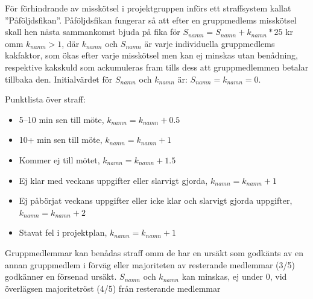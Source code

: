 \documentclass[a4paper]{article}
\begin{document}
För förhindrande av misskötsel i projektgruppen införs ett straffsystem kallat ”Påföljdsfikan”. Påföljdsfikan fungerar så att efter en gruppmedlems misskötsel skall hen nästa sammankomst bjuda på fika för $S_{namn} = S_{namn} + k_{namn}*25$ kr omm $k_{namn}>1$, där $k_{namn}$ och $S_{namn}$ är varje individuella gruppmedlems kakfaktor, som ökas efter varje misskötsel men kan ej minskas utan benådning, respektive kakskuld som ackumuleras fram tills dess att gruppmedlemmen betalar tillbaka den. Initialvärdet för $S_{namn}$ och $k_{namn}$ är: $S_{namn}=k_{namn}=0.$\\ \par
Punktlista över straff:
\begin{itemize}
	\item 5–10 min sen till möte, $k_{namn} = k_{namn} + 0.5$
	\item 10+ min sen till möte, $k_{namn} = k_{namn} + 1$
	\item Kommer ej till mötet, $k_{namn} = k_{namn} + 1.5$
	\item Ej klar med veckans uppgifter eller slarvigt gjorda, $k_{namn} = k_{namn} + 1$
	\item Ej påbörjat veckans uppgifter eller icke klar och slarvigt gjorda uppgifter, \indent $k_{namn} = k_{namn} + 2$
	\item Stavat fel i projektplan, $k_{namn} = k_{namn} + 1$
\end{itemize}
\par
Gruppmedlemmar kan benådas straff omm de har en ursäkt som godkänts av en annan gruppmedlem i förväg eller majoriteten av resterande medlemmar (3/5) godkänner en försenad ursäkt. $S_{namn}$ och $k_{namn}$ kan minskas, ej under 0, vid överlägsen majoritetröst (4/5) från resterande medlemmar



%
%
\end{document}
